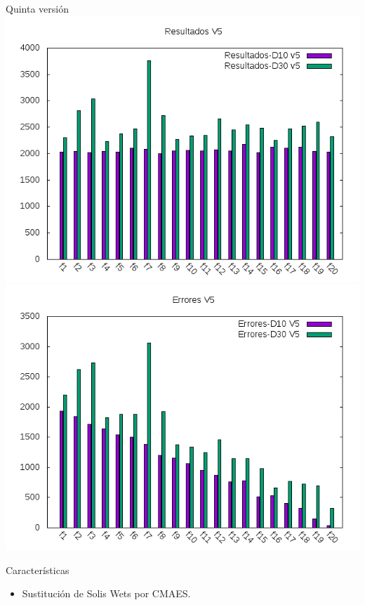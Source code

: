 \documentclass[10pt]{beamer}
\begin{document}
	\begin{frame}[fragile]{Quinta versión}
		\centering
		\includegraphics[scale=0.25]{./Imagenes/Resultados/resultados_v5.png}
		\includegraphics[scale=0.25]{./Imagenes/Errores/errores_v5.png}
		
		\begin{block}{Características}
			\begin{itemize}
				\item Sustitución de Solis Wets por CMAES.
			\end{itemize}
		\end{block}
	\end{frame}
\end{document}
